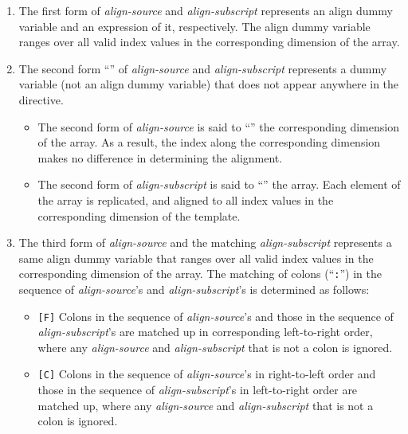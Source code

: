 \begin{enumerate}
\item The first form of {\it align-source} and {\it align-subscript}
      represents an align dummy variable and an expression of it,
      respectively. The align dummy variable ranges over all valid index
      values in the corresponding dimension of the array.
\item The second form ``{\tt *}'' of {\it align-source} and {\it
      align-subscript} represents a dummy variable (not an align dummy
      variable) that does not appear anywhere in the directive.
      \begin{itemize} 
       \item The second form of {\it align-source} is said to
	     ``'' the corresponding dimension of the array. As a
	     result, the index along the corresponding dimension makes
	     no difference in determining the alignment.
       \item The second form of {\it align-subscript} is said to
	     ``'' the array. Each element of the array is
	     replicated, and aligned to all index values in the
	     corresponding dimension of the template.
      \end{itemize}
\item The third form of {\it align-source} and the matching {\it
      align-subscript} represents a same align dummy variable that
      ranges over all valid index values in the corresponding dimension
      of the array. The matching of colons (``{\tt :}'') in the sequence
      of {\it align-source}'s and {\it align-subscript}'s is determined
      as follows:

      \begin{itemize}
       \item \verb![F]! Colons in the sequence of {\it align-source}'s
	     and those in the sequence of {\it align-subscript}'s are
	     matched up in corresponding left-to-right order, where any
	     {\it align-source} and {\it align-subscript} that is not a
	     colon is ignored.
       \item \verb![C]! Colons in the sequence of {\it align-source}'s
	     in right-to-left order and those in the sequence of {\it 
	     align-subscript}'s in left-to-right order are matched up,
	     where any {\it align-source} and {\it align-subscript} that
	     is not a colon is ignored.
      \end{itemize}


\end{enumerate}

